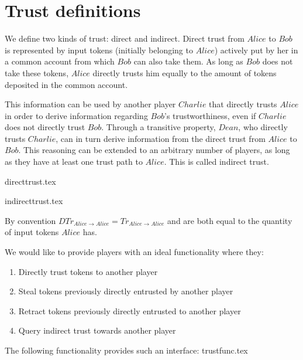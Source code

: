 \section{Trust definitions}
  We define two kinds of trust: direct and indirect. Direct trust from $Alice$ to $Bob$ is represented by input tokens
  (initially belonging to $Alice$) actively put by her in a common account from which $Bob$ can also take them. As long as
  $Bob$ does not take these tokens, $Alice$ directly trusts him equally to the amount of tokens deposited in the common
  account.
  
  This information can be used by another player $Charlie$ that directly trusts $Alice$ in order to derive information
  regarding $Bob$'s trustworthiness, even if $Charlie$ does not directly trust $Bob$. Through a transitive property, $Dean$,
  who directly trusts $Charlie$, can in turn derive information from the direct trust from $Alice$ to $Bob$. This reasoning can
  be extended to an arbitrary number of players, as long as they have at least one trust path to $Alice$. This is called
  indirect trust.

  {directtrust.tex}

  {indirecttrust.tex}

  By convention $DTr_{Alice \rightarrow Alice} = Tr_{Alice \rightarrow Alice}$ and are both equal to the quantity of input
  tokens $Alice$ has.

  We would like to provide players with an ideal functionality where they:
  \begin{enumerate}
    \item Directly trust tokens to another player
    \item Steal tokens previously directly entrusted by another player
    \item Retract tokens previously directly entrusted to another player
    \item Query indirect trust towards another player
  \end{enumerate}
  The following functionality provides such an interface:
  {trustfunc.tex}
